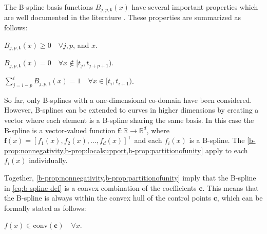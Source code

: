 


The B-spline basis functions $B_{j, p, \mathbf{t}}(x)$ have several important properties which are well documented in the literature \citep{deBoor1978practicalguide}. These properties are summarized as follows:
\begin{property}[Nonnegativity]\label{b-prop:nonnegativity}
    $B_{j, p, \mathbf{t}}(x) \geq 0 \quad\forall j, p$, and $x$.
\end{property}

\begin{property}\label{b-prop:localsupport}
    $B_{j, p, \mathbf{t}}(x)=0 \quad\forall x \notin [t_j, t_{j+p+1})$.
\end{property}

\begin{property}\label{b-prop:partitionofunity}
    $\sum_{j=i-p}^i B_{j, p, \mathbf{t}}(x)=1 \quad\forall x \in [t_i, t_{i+1})$.
\end{property}

So far, only B-splines with a one-dimensional co-domain have been considered. However, B-splines can be extended to curves in higher dimensions by creating a vector where each element is a B-spline sharing the same basis. In this case the B-spline is a vector-valued function $\mathbf{f}: \mathbb R \rightarrow \mathbb R^d$, where $\mathbf{f}(x) = [f_1(x), f_2(x), \dots, f_d(x)]^\top$ and each $f_i(x)$ is a B-spline. The \cref{b-prop:nonnegativity,b-prop:localsupport,b-prop:partitionofunity} apply to each $f_i(x)$ individually. 


Together, \cref{b-prop:nonnegativity,b-prop:partitionofunity} imply that the B-spline in \cref{eq:b-spline-def} is a convex combination of the coefficients $\mathbf c$. This means that the B-spline is always within the convex hull of the control points $\mathbf c$, which can be formally stated as follows:
\begin{property}\label{b-prop:convexhull}
    $f(x) \in \text{conv}(\mathbf{c})
    \quad\forall x$.
\end{property}

